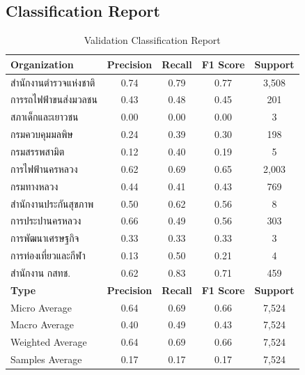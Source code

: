\documentclass[12pt, a4paper]{article}
\begin{document}
            \subsection{Classification Report}
                \begin{table}[h]
                \centering
                \begin{tabular}{|l|c|c|c|c|}
                    \hline
                    \rule{0pt}{2.5ex}
                    \textbf{Organization} & \textbf{Precision} & \textbf{Recall} & \textbf{F1 Score} & \textbf{Support} \\
                    \hline \hline
                    สำนักงานตำรวจแห่งชาติ & 0.74 & 0.79 & 0.77 & 3,508 \\
                    การรถไฟฟ้าขนส่งมวลชน & 0.43 & 0.48 & 0.45 & 201 \\
                    สภาเด็กและเยาวชน & 0.00 & 0.00 & 0.00 & 3 \\
                    กรมควบคุมมลพิษ & 0.24 & 0.39 & 0.30 & 198 \\
                    กรมสรรพสามิต & 0.12 & 0.40 & 0.19 & 5 \\
                    การไฟฟ้านครหลวง & 0.62 & 0.69 & 0.65 & 2,003 \\
                    กรมทางหลวง & 0.44 & 0.41 & 0.43 & 769 \\
                    สำนักงานประกันสุขภาพ & 0.50 & 0.62 & 0.56 & 8 \\
                    การประปานครหลวง & 0.66 & 0.49 & 0.56 & 303 \\
                    การพัฒนาเศรษฐกิจ & 0.33 & 0.33 & 0.33 & 3 \\
                    การท่องเที่ยวและกีฬา & 0.13 & 0.50 & 0.21 & 4 \\
                    สำนักงาน กสทช. & 0.62 & 0.83 & 0.71 & 459 \\
                    \hline \hline
                    \textbf{Type} & \textbf{Precision} & \textbf{Recall} & \textbf{F1 Score} & \textbf{Support} \\
                    \hline \hline
                    Micro Average & 0.64 & 0.69 & 0.66 & 7,524 \\
                    Macro Average & 0.40 & 0.49 & 0.43 & 7,524 \\
                    Weighted Average & 0.64 & 0.69 & 0.66 & 7,524 \\
                    Samples Average & 0.17 & 0.17 & 0.17 & 7,524 \\
                    \hline
                \end{tabular}
                \caption{Validation Classification Report}
            \end{table}
\end{document}
